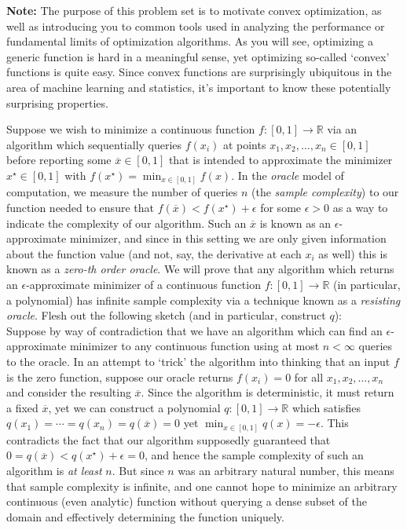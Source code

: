 \documentclass[12pt,letterpaper,cm]{hmcpset}
\newcommand\R{\mathbb{R}}
\begin{document}
\textbf{Note:} The purpose of this problem set is to motivate convex optimization, as well as introducing you to common tools used in analyzing the performance or fundamental limits of optimization algorithms. As you will see, optimizing a generic function is hard in a meaningful sense, yet optimizing so-called `convex' functions is quite easy. Since convex functions are surprisingly ubiquitous in the area of machine learning and statistics, it's important to know these potentially surprising properties.

\begin{problem}[1]
    Suppose we wish to minimize a continuous function $f : [0,1] \to \R$ via an algorithm which sequentially queries $f(x_i)$ at points $x_1,x_2,\ldots,x_n\in [0,1]$ before reporting some $\overline x\in[0,1]$ that is intended to approximate the minimizer $x^\star\in[0,1]$ with $f(x^\star) = \min_{x\in[0,1]}f(x)$. In the \emph{oracle} model of computation, we measure the number of queries $n$ (the \emph{sample complexity}) to our function needed to ensure that $f(\overline x) < f(x^\star) + \epsilon$ for some $\epsilon > 0$ as a way to indicate the complexity of our algorithm. Such an $\overline x$ is known as an $\epsilon$-approximate minimizer, and since in this setting we are only given information about the function value (and not, say, the derivative at each $x_i$ as well) this is known as a \emph{zero-th order oracle}. We will prove that any algorithm which returns an $\epsilon$-approximate minimizer of a continuous function $f : [0,1] \to \R$ (in particular, a polynomial) has infinite sample complexity via a technique known as a \emph{resisting oracle}. Flesh out the following sketch (and in particular, construct $q$):\\

    Suppose by way of contradiction that we have an algorithm which can find an $\epsilon$-approximate minimizer to any continuous function using at most $n < \infty$ queries to the oracle. In an attempt to `trick' the algorithm into thinking that an input $f$ is the zero function, suppose our oracle returns $f(x_i) = 0$ for all $x_1,x_2,\ldots,x_n$ and consider the resulting $\overline x$. Since the algorithm is deterministic, it must return a fixed $\overline x$, yet we can construct a polynomial $q:[0,1]\to\R$ which satisfies $q(x_1)=\cdots=q(x_n)=q(\overline x)=0$ yet $\min_{x\in[0,1]}q(x) = -\epsilon$. This contradicts the fact that our algorithm supposedly guaranteed that $0 = q(\overline x) < q(x^\star) + \epsilon = 0$, and hence the sample complexity of such an algorithm is \emph{at least} $n$. But since $n$ was an arbitrary natural number, this means that sample complexity is infinite, and one cannot hope to minimize an arbitrary continuous (even analytic) function without querying a dense subset of the domain and effectively determining the function uniquely.
\end{problem}
\end{document}
